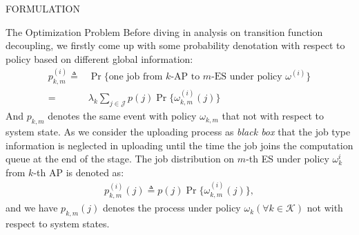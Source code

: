 \documentclass[10pt, conference, letterpaper]{IEEEtran}
\newcommand{\define}{\triangleq}
\newcommand{\apSet}{\mathcal{K}}
\newcommand{\jSet}{\mathcal{J}}
\begin{document}
\begin{section}{FORMULATION}
\begin{subsection}{The Optimization Problem}
            Before diving in analysis on transition function decoupling, we firstly come up with some probability denotation with respect to policy based on different global information:
            \begin{align}
                p^{(i)}_{k,m} \define& \Pr\{\text{one job from $k$-AP to $m$-ES under policy $\omega^{(i)}$}\}
                \nonumber\\
                =& \lambda_k \sum_{j\in\jSet} p(j) \Pr\{\omega^{(i)}_{k,m}(j)\}
            \end{align}
            And $p_{k,m}$ denotes the same event with policy $\omega_{k,m}$ that not with respect to system state.
            As we consider the uploading process as \emph{black box} that the job type information is neglected in uploading until the time the job joins the computation queue at the end of the stage. The job distribution on $m$-th ES under policy $\omega^{i}_k$ from $k$-th AP is denoted as:
            \begin{align}
                p^{(i)}_{k,m}(j) \define p(j) \Pr\{\omega^{(i)}_{k,m}(j)\},
            \end{align}
            and we have $p_{k,m}(j)$ denotes the process under policy $\omega_k (\forall k\in\apSet)$ not with respect to system states.


\end{subsection}
\end{section}
\end{document}
